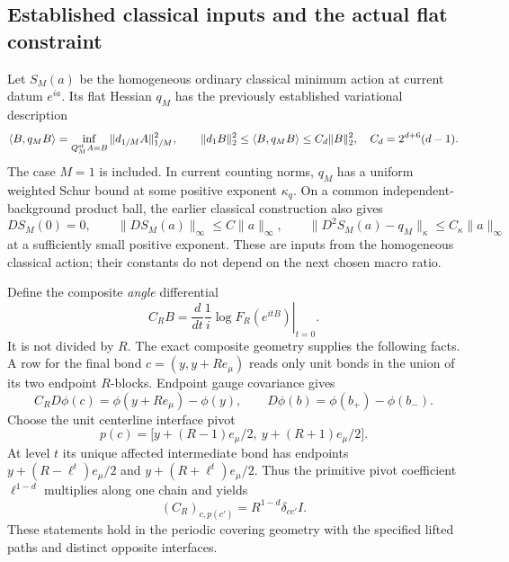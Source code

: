 \documentclass[11pt]{article}
\theoremstyle{remark}
\begin{document}
\subsection{Established classical inputs and the actual flat constraint}
\label{cmq-input-section}

Let $S_M(a)$ be the homogeneous ordinary classical minimum action
at current datum $e^{ia}$. Its flat Hessian $q_M$ has the previously
established variational description
\begin{equation}
 \langle B,q_MB\rangle
 =\inf_{Q_M^{\rm st} A=B}\|d_{1/M}A\|_{1/M}^2,
 \qquad
 \|d_1B\|_2^2\leq\langle B,q_MB\rangle
 \leq C_d\|B\|_2^2,
 \quad C_d=2^{d+6}(d-1).
 \label{cmq-classical-input}
\end{equation}
The case $M=1$ is included. In current counting norms, $q_M$ has a
uniform weighted Schur bound at some positive exponent $\kappa_q$.
On a common independent-background product ball, the earlier
classical construction also gives
\begin{equation}
 DS_M(0)=0,\qquad
 \|DS_M(a)\|_\infty\leq C\|a\|_\infty,
 \qquad
 \|D^2S_M(a)-q_M\|_\kappa\leq C_\kappa\|a\|_\infty
 \label{cmq-classical-nonlinear-input}
\end{equation}
at a sufficiently small positive exponent. These are inputs from
the homogeneous classical action; their constants do not depend
on the next chosen macro ratio.

Define the composite \emph{angle} differential
\begin{equation}
 C_RB=\left.\frac{d}{dt}\frac1i
            \log F_R(e^{itB})\right|_{t=0}.
 \label{cmq-constraint}
\end{equation}
It is not divided by $R$. The exact composite geometry supplies
the following facts. A row for the final bond $c=(y,y+Re_\mu)$
reads only unit bonds in the union of its two endpoint $R$-blocks.
Endpoint gauge covariance gives
\begin{equation}
 C_RD\phi(c)=\phi(y+Re_\mu)-\phi(y),
 \qquad D\phi(b)=\phi(b_+)-\phi(b_-).
 \label{cmq-gradient}
\end{equation}
Choose the unit centerline interface pivot
\begin{equation}
 p(c)=\big[y+(R-1)e_\mu/2,\ y+(R+1)e_\mu/2\big].
 \label{cmq-pivot}
\end{equation}
At level $t$ its unique affected intermediate bond has endpoints
$y+(R-\ell^t)e_\mu/2$ and $y+(R+\ell^t)e_\mu/2$.
Thus the primitive pivot coefficient $\ell^{1-d}$ multiplies
along one chain and yields
\begin{equation}
 (C_R)_{c,p(c')}=R^{1-d}\delta_{cc'}I.
 \label{cmq-pivot-coefficient}
\end{equation}
These statements hold in the periodic covering geometry with
the specified lifted paths and distinct opposite interfaces.
\end{document}
